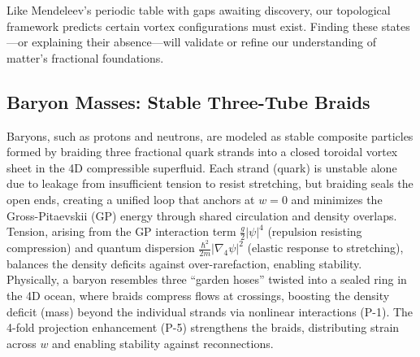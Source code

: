 Like Mendeleev's periodic table with gaps awaiting discovery, our topological framework predicts certain vortex configurations must exist. Finding these states---or explaining their absence---will validate or refine our understanding of matter's fractional foundations.


\subsection{Baryon Masses: Stable Three-Tube Braids}

Baryons, such as protons and neutrons, are modeled as stable composite particles formed by braiding three fractional quark strands into a closed toroidal vortex sheet in the 4D compressible superfluid. Each strand (quark) is unstable alone due to leakage from insufficient tension to resist stretching, but braiding seals the open ends, creating a unified loop that anchors at $w=0$ and minimizes the Gross-Pitaevskii (GP) energy through shared circulation and density overlaps. Tension, arising from the GP interaction term $\frac{g}{2} |\psi|^4$ (repulsion resisting compression) and quantum dispersion $\frac{\hbar^2}{2m} |\nabla_4 \psi|^2$ (elastic response to stretching), balances the density deficits against over-rarefaction, enabling stability. Physically, a baryon resembles three ``garden hoses'' twisted into a sealed ring in the 4D ocean, where braids compress flows at crossings, boosting the density deficit (mass) beyond the individual strands via nonlinear interactions (P-1). The 4-fold projection enhancement (P-5) strengthens the braids, distributing strain across $w$ and enabling stability against reconnections.

